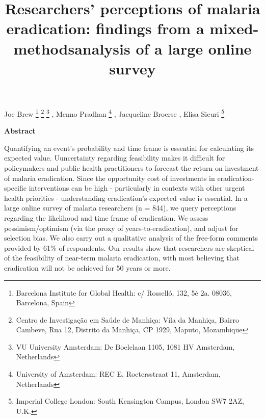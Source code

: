\documentclass[]{article}
\title{Researchers' perceptions of malaria eradication: findings from a
mixed-methodsanalysis of a large online survey}
\author{}
\date{}
\let\rmarkdownfootnote\footnote%
\def\footnote{\protect\rmarkdownfootnote}
\newcommand{\footremember}[2]{%
    \footnote{#2}
    \newcounter{#1}
    \setcounter{#1}{\value{footnote}}%
}
\newcommand{\footrecall}[1]{%
    \footnotemark[\value{#1}]%
}
\begin{document}
\maketitle

\begin{center}
\begin{large}

Joe Brew\footremember{isglobal}{Barcelona Institute for Global Health: c/ Rosselló, 132, 5è 2a. 08036, Barcelona, Spain}\footremember{cism}{Centro de Investigação em Saúde de Manhiça: Vila da Manhiça, Bairro Cambeve, Rua 12, Distrito da Manhiça, CP 1929, Maputo, Mozambique}\footremember{vu}{VU University Amsterdam: De Boelelaan 1105, 1081 HV Amsterdam, Netherlands}, Menno Pradhan\footrecall{vu}\footremember{uva}{University of Amsterdam: REC E, Roetersstraat 11, Amsterdam, Netherlands}, Jacqueline Broerse\footrecall{vu}, Elisa Sicuri\footrecall{isglobal}\footremember{icl}{Imperial College London: South Kensington Campus, London SW7 2AZ, U.K.}\footrecall{cism}

\end{large}
\end{center}

\vspace{5mm}

\begin{center}
\textbf{Abstract}  
\end{center}

\vspace{5mm}

\begin{center}
\begin{changemargin}{3cm}{3cm} 

Quantifying an event's probability and time frame is essential for calculating its expected value. Uuncertainty regarding feasibility makes it difficult for policymakers and public health practitioners to forecast the return on investment of malaria eradication. Since the opportunity cost of investments in eradication-specific interventions can be high - particularly in contexts with other urgent health priorities - understanding eradication's expected value is essential. In a large online survey of malaria researchers (n = 844), we query perceptions regarding the likelihood and time frame of eradication. We assess pessimism/optimism (via the proxy of years-to-eradication), and adjust for selection bias. We also carry out a qualitative analysis of the free-form comments provided by 61\% of respondents. Our results show that researchers are skeptical of the feasibility of near-term malaria eradication, with most believing that eradication will not be achieved for 50 years or more.
\end{changemargin}
\end{center}
\end{document}
